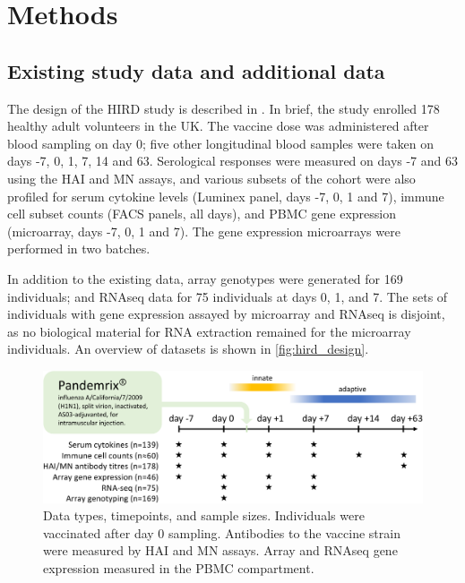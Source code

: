 \section{Methods}

\subsection{Existing  study data and additional data}
\label{subsec:hird_dge_studyDesign}

The design of the \gls{HIRD} study is described in \autocite{sobolev2016AdjuvantedInfluenzaH1N1Vaccination}.
In brief, the study enrolled 178 healthy adult volunteers in the UK.
The vaccine dose was administered after blood sampling on day 0; five other longitudinal blood samples were taken on days -7, 0, 1, 7, 14 and 63.
Serological responses were measured on days -7 and 63 using the \gls{HAI} and \gls{MN} assays, and various subsets of the cohort were also profiled for serum cytokine levels (Luminex panel, days -7, 0, 1 and 7), immune cell subset counts (\gls{FACS} panels, all days), and \gls{PBMC} gene expression (microarray, days -7, 0, 1 and 7).
The gene expression microarrays were performed in two batches.

In addition to the existing data, array genotypes were generated for 169 individuals; and \gls{RNAseq} data for 75 individuals at days 0, 1, and 7.
The sets of individuals with gene expression assayed by microarray and \gls{RNAseq} is disjoint, as no biological material for RNA extraction remained for the microarray individuals.
An overview of datasets is shown in \autoref{fig:hird_design}.

\begin{figure}
    \includegraphics[width=1.0\textwidth]{mainmatter/figures/chapter_02/graphics_ashg19/hird_design-crop.pdf}
    \caption{Data types, timepoints, and sample sizes. Individuals were vaccinated after day 0 sampling. Antibodies to the vaccine strain were measured by \gls{HAI} and \gls{MN} assays. Array and \gls{RNAseq} gene expression measured in the \gls{PBMC} compartment.}
    \label{fig:hird_design}
\end{figure}


